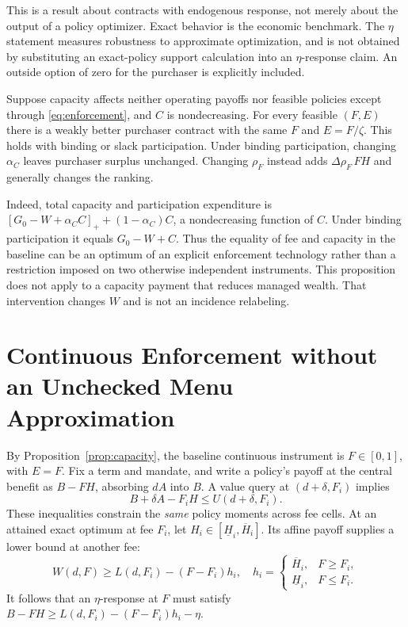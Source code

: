 This is a result about contracts with endogenous response, not merely about the output of a policy optimizer. Exact behavior is the economic benchmark. The $\eta$ statement measures robustness to approximate optimization, and is not obtained by substituting an exact-policy support calculation into an $\eta$-response claim. An outside option of zero for the purchaser is explicitly included.

\begin{proposition}
\label{prop:capacity}
Suppose capacity affects neither operating payoffs nor feasible policies except through \eqref{eq:enforcement}, and $C$ is nondecreasing. For every feasible $(F,E)$ there is a weakly better purchaser contract with the same $F$ and $E=F/\zeta$. This holds with binding or slack participation. Under binding participation, changing $\alpha_C$ leaves purchaser surplus unchanged. Changing $\rho_F$ instead adds $\Delta\rho_F\,FH$ and generally changes the ranking.
\end{proposition}

Indeed, total capacity and participation expenditure is
$[G_0-W+\alpha_C C]_++(1-\alpha_C)C$, a nondecreasing function of $C$. Under binding participation it equals $G_0-W+C$. Thus the equality of fee and capacity in the baseline can be an optimum of an explicit enforcement technology rather than a restriction imposed on two otherwise independent instruments. This proposition does not apply to a capacity payment that reduces managed wealth. That intervention changes $W$ and is not an incidence relabeling.

\section{Continuous Enforcement without an Unchecked Menu Approximation}
\label{sec:continuous}
By Proposition~\ref{prop:capacity}, the baseline continuous instrument is $F\in[0,1]$, with $E=F$. Fix a term and mandate, and write a policy's payoff at the central benefit as $B-FH$, absorbing $dA$ into $B$. A value query at $(d+\delta,F_i)$ implies
\begin{equation}
 B+\delta A-F_iH\leq U(d+\delta,F_i).
 \label{eq:continuousquery}
\end{equation}
These inequalities constrain the \emph{same} policy moments across fee cells. At an attained exact optimum at fee $F_i$, let $H_i\in[\underline H_i,\overline H_i]$. Its affine payoff supplies a lower bound at another fee:
\begin{equation}
 W(d,F)\geq L(d,F_i)-(F-F_i)h_i,
 \quad h_i=\begin{cases}\overline H_i,&F\geq F_i,\\
 \underline H_i,&F\leq F_i.\end{cases}
 \label{eq:feesupport}
\end{equation}
It follows that an $\eta$-response at $F$ must satisfy $B-FH\geq L(d,F_i)-(F-F_i)h_i-\eta$.

